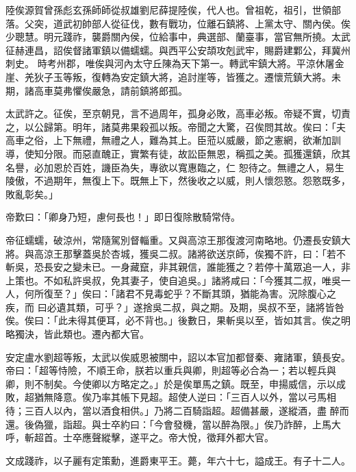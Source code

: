 
\begin{pinyinscope}

 陸俟源賀曾孫彪玄孫師師從叔雄劉尼薛提陸俟，代人也。曾祖乾，祖引，世領部落。父突，道武初帥部人從征伐，數有戰功，位離石鎮將、上黨太守、關內侯。俟少聰慧。明元踐祚，襲爵關內侯，位給事中，典選部、蘭臺事，當官無所撓。太武征赫連昌，詔俟督諸軍鎮以備蠕蠕。與西平公安頡攻剋武牢，賜爵建鄴公，拜冀州刺史。
 時考州郡，唯俟與河內太守丘陳為天下第一。轉武牢鎮大將。平涼休屠金崖、羌狄子玉等叛，復轉為安定鎮大將，追討崖等，皆獲之。遷懷荒鎮大將。未期，諸高車莫弗懼俟嚴急，請前鎮將郎孤。



 太武許之。征俟，至京朝見，言不過周年，孤身必敗，高車必叛。帝疑不實，切責之，以公歸第。明年，諸莫弗果殺孤以叛。帝聞之大驚，召俟問其故。俟曰：「夫高車之俗，上下無禮，無禮之人，難為其上。臣蒞以威嚴，節之憲網，欲漸加訓導，使知分限。而惡直醜正，實繁有徒，故訟臣無恩，稱孤之美。孤獲還鎮，欣其名譽，必加恩於百姓，譏臣為失，專欲以寬惠臨之，仁
 恕待之。無禮之人，易生陵傲，不過期年，無復上下。既無上下，然後收之以威，則人懷怨憝。怨憝既多，敗亂彰矣。」



 帝歎曰：「卿身乃短，慮何長也！」即日復除散騎常侍。



 帝征蠕蠕，破涼州，常隨駕別督輜重。又與高涼王那復渡河南略地。仍遷長安鎮大將。與高涼王那擊蓋吳於杏城，獲吳二叔。諸將欲送京師，俟獨不許，曰：「若不斬吳，恐長安之變未已。一身藏竄，非其親信，誰能獲之？若停十萬眾追一人，非上策也。不如私許吳叔，免其妻子，使自追吳。」諸將咸曰：「今獲其二叔，唯吳一人，何所復至？」俟曰：「諸君不見毒蛇乎？不斷其頭，猶能為害。況除腹心之疾，而
 曰必遺其類，可乎？」遂捨吳二叔，與之期。及期，吳叔不至，諸將皆咎俟。俟曰：「此未得其便耳，必不背也。」後數日，果斬吳以至，皆如其言。俟之明略獨決，皆此類也。遷內都大官。



 安定盧水劉超等叛，太武以俟威恩被關中，詔以本官加都督秦、雍諸軍，鎮長安。帝曰：「超等恃險，不順王命，朕若以重兵與卿，則超等必合為一；若以輕兵與卿，則不制矣。今使卿以方略定之。」於是俟單馬之鎮。既至，申揚威信，示以成敗，超猶無降意。俟乃率其帳下見超。超使人逆曰：「三百人以外，當以弓馬相待；三百人以內，當以酒食相供。」乃將二百騎詣超。超備甚嚴，遂縱酒，盡
 醉而還。後偽獵，詣超。與士卒約曰：「今會發機，當以醉為限。」俟乃詐醉，上馬大呼，斬超首。士卒應聲縱擊，遂平之。帝大悅，徵拜外都大官。



 文成踐祚，以子麗有定策勳，進爵東平王。薨，年六十七，謚成王。有子十二人。




\end{pinyinscope}
